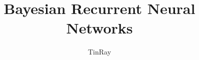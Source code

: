 \documentclass{beamer}
\title{Bayesian Recurrent Neural Networks}
\date{TinRay}
\begin{document}
\frame{\titlepage}


% 
% 
% 
% 
% 
\end{document}
